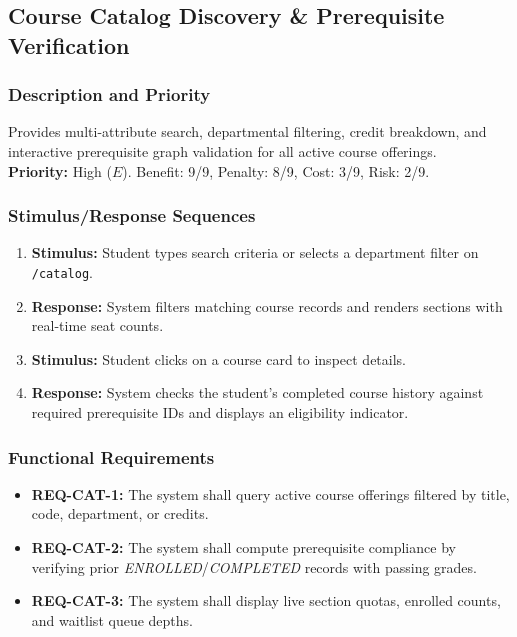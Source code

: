 \documentclass[a4paper,12pt]{article}
\begin{document}
\subsection{Course Catalog Discovery \& Prerequisite Verification}

\subsubsection{Description and Priority}
Provides multi-attribute search, departmental filtering, credit breakdown, and interactive prerequisite graph validation for all active course offerings. \\
\textbf{Priority:} High ($E$). Benefit: 9/9, Penalty: 8/9, Cost: 3/9, Risk: 2/9.

\subsubsection{Stimulus/Response Sequences}
\begin{enumerate}[leftmargin=1.2cm]
    \item \textbf{Stimulus:} Student types search criteria or selects a department filter on \texttt{/catalog}.
    \item \textbf{Response:} System filters matching course records and renders sections with real-time seat counts.
    \item \textbf{Stimulus:} Student clicks on a course card to inspect details.
    \item \textbf{Response:} System checks the student's completed course history against required prerequisite IDs and displays an eligibility indicator.
\end{enumerate}

\subsubsection{Functional Requirements}
\begin{itemize}[leftmargin=1.2cm]
    \item \textbf{REQ-CAT-1:} The system shall query active course offerings filtered by title, code, department, or credits.
    \item \textbf{REQ-CAT-2:} The system shall compute prerequisite compliance by verifying prior \textit{ENROLLED}/\textit{COMPLETED} records with passing grades.
    \item \textbf{REQ-CAT-3:} The system shall display live section quotas, enrolled counts, and waitlist queue depths.
\end{itemize}
\end{document}
